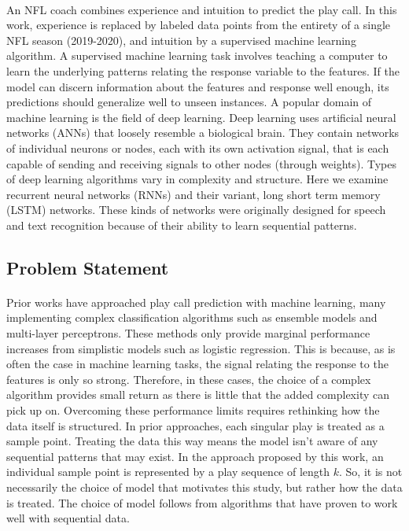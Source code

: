 \documentclass{article}
\begin{document}
\begin{multicols*}{2}
            \paragraph{}
                An NFL coach combines experience and intuition to predict the play call. 
                In this work, experience is replaced by labeled data points from the entirety of a single NFL season (2019-2020), and intuition by a supervised machine learning algorithm. 
                A supervised machine learning task involves teaching a computer to learn the underlying patterns relating the response variable to the features. 
                If the model can discern information about the features and response well enough, its predictions should generalize well to unseen instances. 
                A popular domain of machine learning is the field of deep learning. 
                Deep learning uses artificial neural networks (ANNs) that loosely resemble a biological brain. 
                They contain networks of individual neurons or nodes, each with its own activation signal, that is each capable of sending and receiving signals to other nodes (through weights). 
                Types of deep learning algorithms vary in complexity and structure. 
                Here we examine recurrent neural networks (RNNs) and their variant, long short term memory (LSTM) networks. 
                These kinds of networks were originally designed for speech and text recognition because of their ability to learn sequential patterns. 

        \subsection{Problem Statement}
            \paragraph{}
                Prior works have approached play call prediction with machine learning, many implementing complex classification algorithms such as ensemble models and multi-layer perceptrons.
                These methods only provide marginal performance increases from simplistic models such as logistic regression.
                This is because, as is often the case in machine learning tasks, the signal relating the response to the features is only so strong. 
                Therefore, in these cases, the choice of a complex algorithm provides small return as there is little that the added complexity can pick up on.
                Overcoming these performance limits requires rethinking how the data itself is structured.
                In prior approaches, each singular play is treated as a sample point. 
                Treating the data this way means the model isn't aware of any sequential patterns that may exist.
                In the approach proposed by this work, an individual sample point is represented by a play sequence of length $k$. 
                So, it is not necessarily the choice of model that motivates this study, but rather how the data is treated. 
                The choice of model follows from algorithms that have proven to work well with sequential data. 
            

\end{multicols*}
\end{document}
